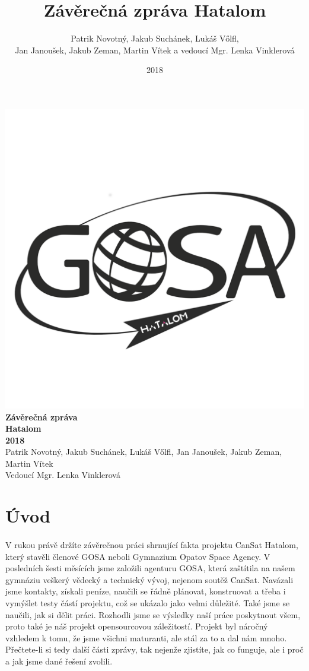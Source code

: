 \documentclass[a4paper]{report}
\title{Závěrečná zpráva Hatalom}
\author{Patrik Novotný, Jakub Suchánek, Lukáš Vőlfl,\\Jan Janoušek, Jakub Zeman, Martin Vítek a vedoucí Mgr. Lenka Vinklerová}
\date{2018}
\newcommand{\comm}[1]{}
\begin{document}
\begin{titlepage}
    \centering
    \vfil
    \includegraphics[width=400pt]{Logo_final.png}
    \vfill
    {\bfseries\Large
        Závěrečná zpráva\\
        Hatalom\\
        2018\\
    }
    \vskip2cm
    \large Patrik Novotný, Jakub Suchánek, Lukáš Vőlfl, Jan Janoušek, Jakub Zeman, Martin Vítek\\
    \vfill
    \large Vedoucí Mgr. Lenka Vinklerová\\
    \vfill
    \vfill
\end{titlepage}
\comm{nebo takto}
\tableofcontents
\section{Úvod}
\paragraph{} V rukou právě držíte závěrečnou práci shrnující fakta projektu CanSat Hatalom, který stavěli členové GOSA neboli Gymnazium Opatov Space Agency. V posledních šesti měsících jsme založili agenturu GOSA, která zaštítila na našem gymnáziu veškerý vědecký a technický vývoj, nejenom soutěž CanSat. Navázali jsme kontakty, získali peníze, naučili se řádně plánovat, konstruovat a třeba i vymýšlet testy částí projektu, což se ukázalo jako velmi důležité. Také jsme se naučili, jak si dělit práci. Rozhodli jsme se výsledky naší práce poskytnout všem, proto také je náš projekt opensourcovou záležitostí. Projekt byl náročný vzhledem k tomu, že jsme všichni maturanti, ale stál za to a dal nám mnoho. Přečtete-li si tedy další části zprávy, tak nejenže zjistíte, jak co funguje, ale i proč a jak jsme dané řešení zvolili.
\end{document}
